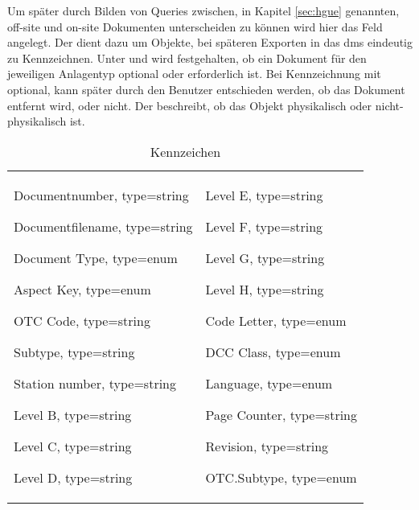 %
Um später durch Bilden von Queries zwischen, in Kapitel \ref{sec:hgue} genannten, off-site und on-site Dokumenten unterscheiden zu können wird hier das Feld  angelegt. Der  dient dazu um Objekte, bei späteren Exporten in das \ac{dms} eindeutig zu Kennzeichnen. Unter  und  wird festgehalten, ob ein Dokument für den jeweiligen Anlagentyp optional oder erforderlich ist. Bei Kennzeichnung mit optional, kann später durch den Benutzer entschieden werden, ob das Dokument entfernt wird, oder nicht.
Der  beschreibt, ob das Objekt physikalisch oder nicht-physikalisch ist. \\
\newpage
%
\begin{table}[H]
\begin{tabular}{ll}
 \parbox{7cm}{
 \begin{compactitem}
  \item Documentnumber, type=string
	\item Documentfilename, type=string
	\item Document Type, type=enum
    \item Aspect Key, type=enum
	\item OTC Code, type=string
    \item Subtype, type=string
    \item Station number, type=string
    \item Level B, type=string
    \item Level C, type=string
    \item Level D, type=string
 \end{compactitem}}
 &
 \parbox{7cm}{
 \begin{compactitem}
  \item Level E, type=string
    \item Level F, type=string
    \item Level G, type=string
    \item Level H, type=string
	\item Code Letter, type=enum
	\item DCC Class, type=enum
	\item Language, type=enum
	\item Page Counter, type=string
    \item Revision, type=string
    \item OTC.Subtype, type=enum
 \end{compactitem}}
 \end{tabular}
 \label{tab:second}
 \caption{Kennzeichen}
 \end{table}

